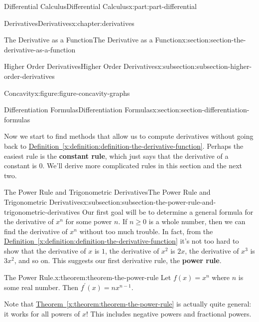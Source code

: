 \documentclass[twoside,10pt,]{tufte-book}
\newcommand{\xreffont}{\relax}
\newcommand{\terminology}[1]{\textbf{#1}}
\numberwithin{equation}{part}
\begin{document}
\begin{partptx}{Differential Calculus}{}{Differential Calculus}{}{}{x:part:part-differential}
\begin{chapterptx}{Derivatives}{}{Derivatives}{}{}{x:chapter:derivatives}
\begin{sectionptx}{The Derivative as a Function}{}{The Derivative as a Function}{}{}{x:section:section-the-derivative-as-a-function}
\begin{subsectionptx}{Higher Order Derivatives}{}{Higher Order Derivatives}{}{}{x:subsection:subsection-higher-order-derivatives}
\begin{figureptx}{Concavity}{x:figure:figure-concavity-graphs}{}
\begin{sidebyside}{2}{0}{0}{0}
\begin{sbspanel}{0.5}
\end{sbspanel}%
\end{sidebyside}%
\tcblower
\end{figureptx}%
\end{subsectionptx}
\end{sectionptx}
%
%
\typeout{************************************************}
\typeout{************************************************}
%
\begin{sectionptx}{Differentiation Formulas}{}{Differentiation Formulas}{}{}{x:section:section-differentiation-formulas}
\begin{introduction}{}%
Now we start to find methods that allow us to compute derivatives without going back to \hyperref[x:definition:definition-the-derivative-function]{Definition~{\xreffont\ref{x:definition:definition-the-derivative-function}}}. Perhaps the easiest rule is the \terminology{constant rule}, which just says that the derivative of a constant is \(0\). We'll derive more complicated rules in this section and the next two.%
\end{introduction}%
%
%
\typeout{************************************************}
\typeout{************************************************}
%
\begin{subsectionptx}{The Power Rule and Trigonometric Derivatives}{}{The Power Rule and Trigonometric Derivatives}{}{}{x:subsection:subsection-the-power-rule-and-trigonometric-derivatives}
Our first goal will be to determine a general formula for the derivative of \(x^{n}\) for some power \(n\). If \(n\geq0\) is a whole number, then we can find the derivative of \(x^{n}\) without too much trouble. In fact, from the \hyperref[x:definition:definition-the-derivative-function]{Definition~{\xreffont\ref{x:definition:definition-the-derivative-function}}} it's not too hard to show that the derivative of \(x\) is \(1\), the derivative of \(x^{2}\) is \(2x\), the derivative of \(x^{3}\) is \(3x^{2}\), and so on. This suggests our first derivative rule, the \terminology{power rule}.%
\begin{theorem}{The Power Rule.}{}{x:theorem:theorem-the-power-rule}%
%
Let \(f(x) = x^{n}\) where \(n\) is some real number. Then \(f^{\prime}(x) = nx^{n-1}\).%
\end{theorem}
Note that \hyperref[x:theorem:theorem-the-power-rule]{Theorem~{\xreffont\ref{x:theorem:theorem-the-power-rule}}} is actually quite general: it works for all powers of \(x\)! This includes negative powers and fractional powers.%

\end{subsectionptx}
\end{sectionptx}
\end{chapterptx}
\end{partptx}
\end{document}
